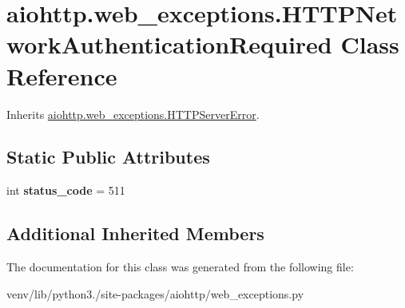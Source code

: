 \hypertarget{classaiohttp_1_1web__exceptions_1_1_h_t_t_p_network_authentication_required}{}\section{aiohttp.\+web\+\_\+exceptions.\+H\+T\+T\+P\+Network\+Authentication\+Required Class Reference}
\label{classaiohttp_1_1web__exceptions_1_1_h_t_t_p_network_authentication_required}


Inherits \hyperlink{classaiohttp_1_1web__exceptions_1_1_h_t_t_p_server_error}{aiohttp.\+web\+\_\+exceptions.\+H\+T\+T\+P\+Server\+Error}.

\subsection*{Static Public Attributes}
\begin{DoxyCompactItemize}
\item 
\mbox{\label{classaiohttp_1_1web__exceptions_1_1_h_t_t_p_network_authentication_required_a34187e87cccb75adba55b73d8a57f8c9}} 
int {\bfseries status\+\_\+code} = 511
\end{DoxyCompactItemize}
\subsection*{Additional Inherited Members}


The documentation for this class was generated from the following file\+:\begin{DoxyCompactItemize}
\item 
venv/lib/python3./site-\/packages/aiohttp/web\+\_\+exceptions.\+py\end{DoxyCompactItemize}

